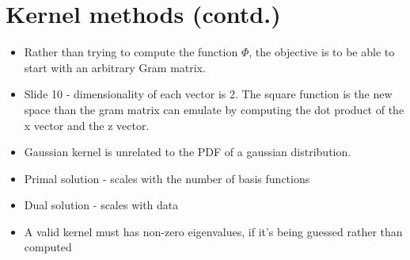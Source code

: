 \documentclass[parskip=half]{scrartcl}
\begin{document}
    \section{Kernel methods (contd.)}\label{kernel-methods-contd.}

    \begin{itemize}
        \item
        Rather than trying to compute the function $\Phi$, the
        objective is to be able to start with an arbitrary Gram matrix.
        \item
        Slide 10 - dimensionality of each vector is 2. The square function is
        the new space than the gram matrix can emulate by computing the dot
        product of the x vector and the z vector.
        \item
        Gaussian kernel is unrelated to the PDF of a gaussian distribution.
        \item
        Primal solution - scales with the number of basis functions
        \item 
        Dual solution - scales with data
        \item 
        A valid kernel must has non-zero eigenvalues, if it's being guessed rather than computed
    \end{itemize}


\newpage
\end{document}
